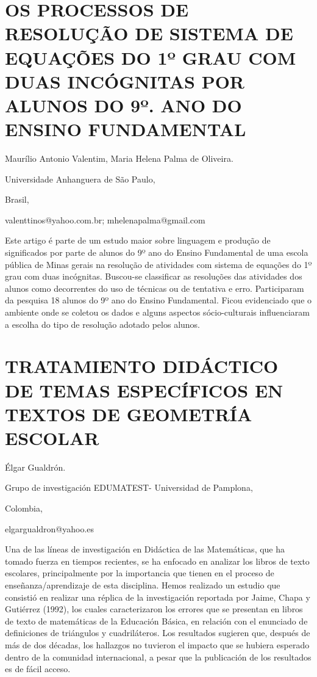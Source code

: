\section{OS PROCESSOS DE RESOLUÇÃO DE SISTEMA DE EQUAÇÕES DO 1º GRAU COM DUAS
INCÓGNITAS POR ALUNOS DO 9º. ANO DO ENSINO FUNDAMENTAL}

\begin{datos}

Maurílio Antonio Valentim, Maria Helena Palma de Oliveira.

Universidade Anhanguera de São Paulo,

Brasil,

valenttinos@yahoo.com.br; mhelenapalma@gmail.com 

\end{datos}

Este artigo é parte de um estudo maior sobre linguagem e produção
de significados por parte de alunos do 9º ano do Ensino Fundamental
de uma escola pública de Minas gerais na resolução de atividades com
sistema de equações do 1º grau com duas incógnitas. Buscou-se classificar
as resoluções das atividades dos alunos como decorrentes do uso de
técnicas ou de tentativa e erro. Participaram da pesquisa 18 alunos
do 9º ano do Ensino Fundamental. Ficou evidenciado que o ambiente
onde se coletou os dados e alguns aspectos sócio-culturais influenciaram
a escolha do tipo de resolução adotado pelos alunos.


\section{TRATAMIENTO DIDÁCTICO DE TEMAS ESPECÍFICOS EN TEXTOS DE GEOMETRÍA
ESCOLAR}

\begin{datos}

Élgar Gualdrón.

Grupo de investigación EDUMATEST- Universidad de Pamplona,

Colombia,

elgargualdron@yahoo.es

\end{datos}

Una de las líneas de investigación en Didáctica de las Matemáticas,
que ha tomado fuerza en tiempos recientes, se ha enfocado en analizar
los libros de texto escolares, principalmente por la importancia que
tienen en el proceso de enseñanza/aprendizaje de esta disciplina.
Hemos realizado un estudio que consistió en realizar una réplica de
la investigación reportada por Jaime, Chapa y Gutiérrez (1992), los
cuales caracterizaron los errores que se presentan en libros de texto
de matemáticas de la Educación Básica, en relación con el enunciado
de definiciones de triángulos y cuadriláteros. Los resultados sugieren
que, después de más de dos décadas, los hallazgos no tuvieron el impacto
que se hubiera esperado dentro de la comunidad internacional, a pesar
que la publicación de los resultados es de fácil acceso.

